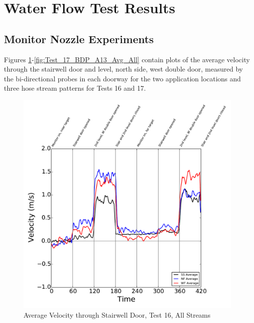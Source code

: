 \documentclass[12pt,oneside]{book}
\begin{document}
\section{Water Flow Test Results}
\label{sec:Water_Flow_Test_Results}

\subsection{Monitor Nozzle Experiments}

Figures \ref{fig:Test_16_BDP_A10_Avg_All}-\ref{fig:Test_17_BDP_A13_Avg_All} contain plots of the average velocity through the stairwell door and  level, north side, west double door, measured by the bi-directional probes in each doorway for the two application locations and three hose stream patterns for Tests 16 and 17. 

\begin{figure}[!ht]
\includegraphics[width=6in]{../../../Figures/Hose_Test_Figures/Test_16_West_063014_custom_BDP_A10_Avg}
\caption{Average Velocity through Stairwell Door, Test 16, All Streams}
\label{fig:Test_16_BDP_A10_Avg_All}
\end{figure}
\end{document}
